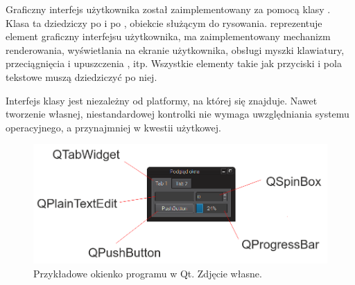 \par
Graficzny interfejs użytkownika został zaimplementowany za pomocą klasy .
Klasa ta dziedziczy po  i po , obiekcie służącym do rysowania.
 reprezentuje element graficzny interfejsu użytkownika, ma zaimplementowany mechanizm renderowania, wyświetlania na ekranie użytkownika, obsługi myszki klawiatury, przeciągnięcia i upuszczenia , itp.
Wszystkie elementy takie jak przyciski i pola tekstowe muszą dziedziczyć po niej.
\par
Interfejs klasy jest niezależny od platformy, na której się znajduje.
Nawet tworzenie własnej, niestandardowej kontrolki nie wymaga uwzględniania systemu operacyjnego, a przynajmniej w kwestii użytkowej.

\begin{figure}[!htbp]
    \centering
    \includegraphics[width=\textwidth]{img/qt-gui-001.png}
    \caption{Przykładowe okienko programu w Qt. Zdjęcie własne.}
    \label{fig:qtgui1}
\end{figure}

